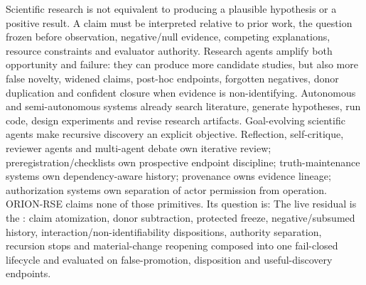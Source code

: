\markdownRendererDocumentBegin
\markdownRendererSectionBegin
{}\markdownRendererInterblockSeparator
{}Scientific research is not equivalent to producing a plausible hypothesis or a positive result. A claim must be interpreted relative to prior work, the question frozen before observation, negative/null evidence, competing explanations, resource constraints and evaluator authority. Research agents amplify both opportunity and failure: they can produce more candidate studies, but also more false novelty, widened claims, post-hoc endpoints, forgotten negatives, donor duplication and confident closure when evidence is non-identifying.\markdownRendererInterblockSeparator
{}Autonomous and semi-autonomous systems already search literature, generate hypotheses, run code, design experiments and revise research artifacts. Goal-evolving scientific agents make recursive discovery an explicit objective. Reflection, self-critique, reviewer agents and multi-agent debate own iterative review; preregistration/checklists own prospective endpoint discipline; truth-maintenance systems own dependency-aware history; provenance owns evidence lineage; authorization systems own separation of actor permission from operation.\markdownRendererInterblockSeparator
{}ORION-RSE claims none of those primitives. Its question is:\markdownRendererInterblockSeparator
{}\markdownRendererBlockQuoteBegin
{}
\markdownRendererBlockQuoteEnd \markdownRendererInterblockSeparator
{}The live residual is the : claim atomization, donor subtraction, protected freeze, negative/subsumed history, interaction/non-identifiability dispositions, authority separation, recursion stops and material-change reopening composed into one fail-closed lifecycle and evaluated on false-promotion, disposition and useful-discovery endpoints.
\markdownRendererSectionEnd \markdownRendererDocumentEnd